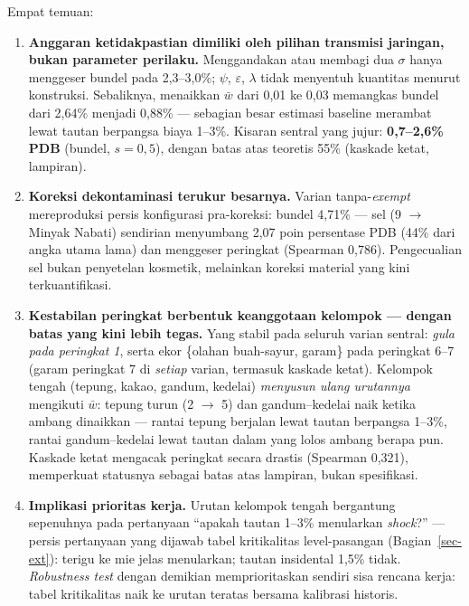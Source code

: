 \documentclass[
  manuscript=article,
  layout=publish,
  year=2026,
  volume=1,
]{den}
\providecommand{\tightlist}{%
  \setlength{\itemsep}{0pt}\setlength{\parskip}{0pt}}
\begin{document}
Empat temuan:

\begin{enumerate}
\def\labelenumi{\arabic{enumi}.}
\tightlist
\item
  \textbf{Anggaran ketidakpastian dimiliki oleh pilihan transmisi
  jaringan, bukan parameter perilaku.} Menggandakan atau membagi dua
  \(\sigma\) hanya menggeser bundel pada 2,3--3,0\%; \(\psi\),
  \(\varepsilon\), \(\lambda\) tidak menyentuh kuantitas menurut
  konstruksi. Sebaliknya, menaikkan \(\bar w\) dari 0,01 ke 0,03
  memangkas bundel dari 2,64\% menjadi 0,88\% --- sebagian besar
  estimasi baseline merambat lewat tautan berpangsa biaya 1--3\%.
  Kisaran sentral yang jujur: \textbf{0,7--2,6\% PDB} (bundel,
  \(s = 0{,}5\)), dengan batas atas teoretis 55\% (kaskade ketat,
  lampiran).
\item
  \textbf{Koreksi dekontaminasi terukur besarnya.} Varian
  tanpa-\emph{exempt} mereproduksi persis konfigurasi pra-koreksi:
  bundel 4,71\% --- sel (9 \(\to\) Minyak Nabati) sendirian menyumbang
  2,07 poin persentase PDB (44\% dari angka utama lama) dan menggeser
  peringkat (Spearman 0,786). Pengecualian sel bukan penyetelan
  kosmetik, melainkan koreksi material yang kini terkuantifikasi.
\item
  \textbf{Kestabilan peringkat berbentuk keanggotaan kelompok --- dengan
  batas yang kini lebih tegas.} Yang stabil pada seluruh varian sentral:
  \emph{gula pada peringkat 1}, serta ekor \{olahan buah-sayur, garam\}
  pada peringkat 6--7 (garam peringkat 7 di \emph{setiap} varian,
  termasuk kaskade ketat). Kelompok tengah (tepung, kakao, gandum,
  kedelai) \emph{menyusun ulang urutannya} mengikuti \(\bar w\): tepung
  turun (2 \(\to\) 5) dan gandum--kedelai naik ketika ambang dinaikkan
  --- rantai tepung berjalan lewat tautan berpangsa 1--3\%, rantai
  gandum--kedelai lewat tautan dalam yang lolos ambang berapa pun.
  Kaskade ketat mengacak peringkat secara drastis (Spearman 0,321),
  memperkuat statusnya sebagai batas atas lampiran, bukan spesifikasi.
\item
  \textbf{Implikasi prioritas kerja.} Urutan kelompok tengah bergantung
  sepenuhnya pada pertanyaan ``apakah tautan 1--3\% menularkan
  \emph{shock}?'' --- persis pertanyaan yang dijawab tabel kritikalitas
  level-pasangan (Bagian~\ref{sec-ext}): terigu ke mie jelas menularkan;
  tautan insidental 1,5\% tidak. \emph{Robustness test} dengan demikian
  memprioritaskan sendiri sisa rencana kerja: tabel kritikalitas naik ke
  urutan teratas bersama kalibrasi historis.
\end{enumerate}
\end{document}
